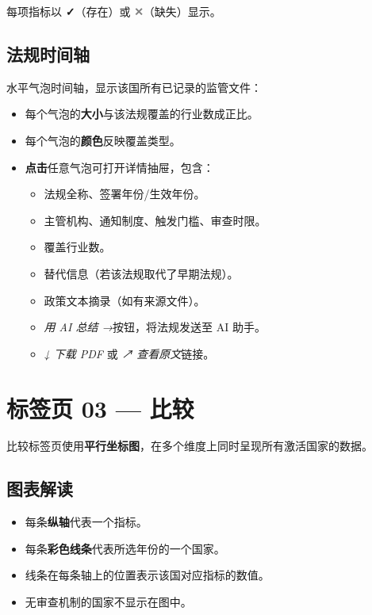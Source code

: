 \documentclass[12pt,a4paper]{article}
\newcommand{\uielem}[1]{\textit{#1}}
\begin{document}
每项指标以 \textcolor{prismgreen}{\textbf{✓}}（存在）或 \textcolor{gray}{\textbf{✕}}（缺失）显示。

\subsection{法规时间轴}

水平气泡时间轴，显示该国所有已记录的监管文件：

\begin{itemize}
  \item 每个气泡的\textbf{大小}与该法规覆盖的行业数成正比。
  \item 每个气泡的\textbf{颜色}反映覆盖类型。
  \item \textbf{点击}任意气泡可打开详情抽屉，包含：
    \begin{itemize}
      \item 法规全称、签署年份/生效年份。
      \item 主管机构、通知制度、触发门槛、审查时限。
      \item 覆盖行业数。
      \item 替代信息（若该法规取代了早期法规）。
      \item 政策文本摘录（如有来源文件）。
      \item \uielem{用 AI 总结 →}按钮，将法规发送至 AI 助手。
      \item \uielem{↓ 下载 PDF} 或 \uielem{↗ 查看原文}链接。
    \end{itemize}
\end{itemize}

\section{标签页 03 — 比较}
\label{sec:compare}

比较标签页使用\textbf{平行坐标图}，在多个维度上同时呈现所有激活国家的数据。

\subsection{图表解读}

\begin{itemize}
  \item 每条\textbf{纵轴}代表一个指标。
  \item 每条\textbf{彩色线条}代表所选年份的一个国家。
  \item 线条在每条轴上的位置表示该国对应指标的数值。
  \item 无审查机制的国家不显示在图中。
\end{itemize}
\end{document}
